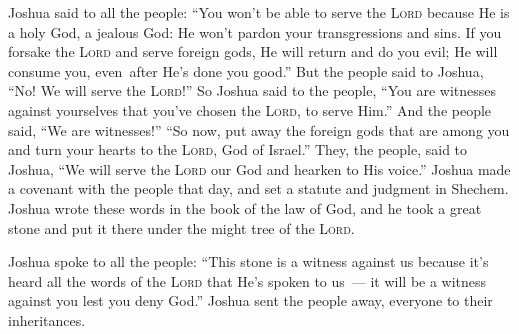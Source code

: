 \begin{inparaenum}
   Joshua said to all the people: ``You won't be able to serve the \textsc{Lord} because He is a holy God, a jealous God: He won't pardon your transgressions and sins.%
   If you forsake the \textsc{Lord} and serve foreign gods, He will return and do you evil; He will consume you, even\understood\ after He's done you good.''%
   But the people said to Joshua, ``No! We will serve the \textsc{Lord}!''%
   So Joshua said to the people, ``You are witnesses against yourselves that you've chosen the \textsc{Lord}, to serve Him.'' And the people said, ``We are witnesses!''%
   ``So now, put away the foreign gods that are among you and turn your hearts to the \textsc{Lord}, God of Israel.''%
   They, the people, said to Joshua, ``We will serve the \textsc{Lord} our God and hearken to His voice.''%
   Joshua made a covenant with the people that day, and set a statute and judgment in Shechem.%
   Joshua wrote these words in the book of the law of God, and he took a great stone and put it there under the might tree of the \textsc{Lord}.%
  
   Joshua spoke to all the people: ``This stone is a witness against us because it's heard all the words of the \textsc{Lord} that He's spoken to us~--- it will be a witness against you lest you deny God.''%
   Joshua sent the people away, everyone to their inheritances.%
  

\end{inparaenum}
